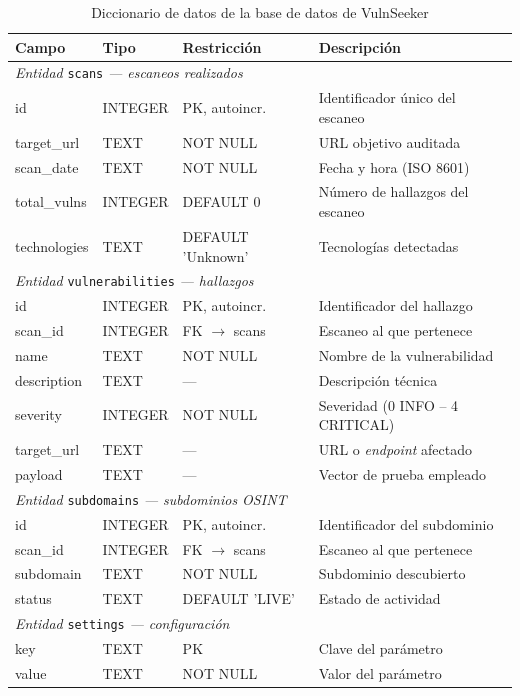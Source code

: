 \documentclass[12pt, a4paper]{article}
\begin{document}
\begin{table}[H]
    \centering
    \caption{Diccionario de datos de la base de datos de VulnSeeker}
    \label{tab:diccionario}
    \small
    \begin{tabular}{p{2.7cm} p{1.9cm} p{2.6cm} p{4.8cm}}
        \toprule
        \textbf{Campo} & \textbf{Tipo} & \textbf{Restricción} & \textbf{Descripción} \\
        \midrule
        \multicolumn{4}{l}{\textit{Entidad} \texttt{scans} \textit{--- escaneos realizados}} \\
        id & INTEGER & PK, autoincr. & Identificador único del escaneo \\
        target\_url & TEXT & NOT NULL & URL objetivo auditada \\
        scan\_date & TEXT & NOT NULL & Fecha y hora (ISO 8601) \\
        total\_vulns & INTEGER & DEFAULT 0 & Número de hallazgos del escaneo \\
        technologies & TEXT & DEFAULT 'Unknown' & Tecnologías detectadas \\
        \midrule
        \multicolumn{4}{l}{\textit{Entidad} \texttt{vulnerabilities} \textit{--- hallazgos}} \\
        id & INTEGER & PK, autoincr. & Identificador del hallazgo \\
        scan\_id & INTEGER & FK $\rightarrow$ scans & Escaneo al que pertenece \\
        name & TEXT & NOT NULL & Nombre de la vulnerabilidad \\
        description & TEXT & --- & Descripción técnica \\
        severity & INTEGER & NOT NULL & Severidad (0 INFO -- 4 CRITICAL) \\
        target\_url & TEXT & --- & URL o \textit{endpoint} afectado \\
        payload & TEXT & --- & Vector de prueba empleado \\
        \midrule
        \multicolumn{4}{l}{\textit{Entidad} \texttt{subdomains} \textit{--- subdominios OSINT}} \\
        id & INTEGER & PK, autoincr. & Identificador del subdominio \\
        scan\_id & INTEGER & FK $\rightarrow$ scans & Escaneo al que pertenece \\
        subdomain & TEXT & NOT NULL & Subdominio descubierto \\
        status & TEXT & DEFAULT 'LIVE' & Estado de actividad \\
        \midrule
        \multicolumn{4}{l}{\textit{Entidad} \texttt{settings} \textit{--- configuración}} \\
        key & TEXT & PK & Clave del parámetro \\
        value & TEXT & NOT NULL & Valor del parámetro \\
        \bottomrule
    \end{tabular}
\end{table}
\end{document}
